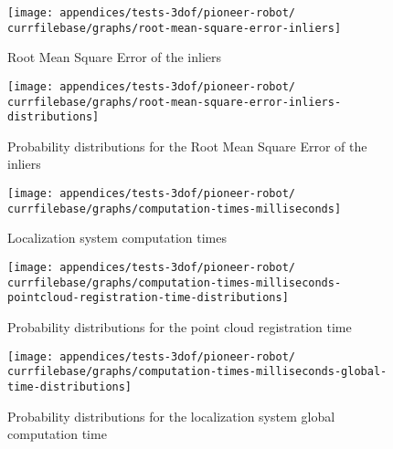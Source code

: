 \begin{figure}[H]
	\centering
	\texttt{[image: appendices/tests-3dof/pioneer-robot/\\currfilebase/graphs/root-mean-square-error-inliers]}
	\caption{Root Mean Square Error of the inliers}
\end{figure}

\begin{figure}[H]
	\centering
	\texttt{[image: appendices/tests-3dof/pioneer-robot/\\currfilebase/graphs/root-mean-square-error-inliers-distributions]}
	\caption{Probability distributions for the Root Mean Square Error of the inliers}
\end{figure}


\begin{figure}[H]
	\centering
	\texttt{[image: appendices/tests-3dof/pioneer-robot/\\currfilebase/graphs/computation-times-milliseconds]}
	\caption{Localization system computation times}
\end{figure}

\begin{figure}[H]
	\centering
	\texttt{[image: appendices/tests-3dof/pioneer-robot/\\currfilebase/graphs/computation-times-milliseconds-pointcloud-registration-time-distributions]}
	\caption{Probability distributions for the point cloud registration time}
\end{figure}

\begin{figure}[H]
	\centering
	\texttt{[image: appendices/tests-3dof/pioneer-robot/\\currfilebase/graphs/computation-times-milliseconds-global-time-distributions]}
	\caption{Probability distributions for the localization system global computation time}
\end{figure}
